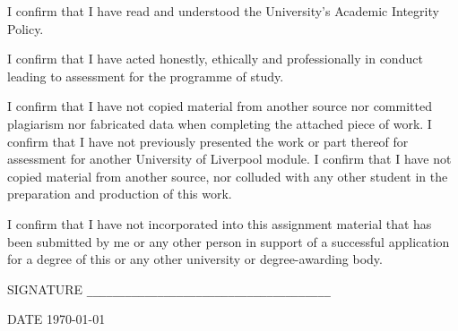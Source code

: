 \documentclass[a4paper,11pt]{report}
\begin{document}
I confirm that I have read and understood the University's Academic Integrity Policy.

I confirm that I have acted honestly, ethically and professionally in conduct leading
to assessment for the programme of study.  

I confirm that I have not copied material from another source nor committed plagiarism
nor fabricated data when completing the attached piece of work.  I confirm that I have 
not previously presented the work or part thereof for assessment for another University
of Liverpool module.  I confirm that I have not copied material from another source, nor
colluded with any other student in the preparation and production of this work.  

I confirm that I have not incorporated into this assignment material that has been 
submitted by me or any other person in support of a successful application for a 
degree of this or any other university or degree-awarding body.  

\vspace*{1in}

\noindent SIGNATURE \verb!______________________________________!

\noindent DATE \hspace*{.4in}  \today

\vspace*{1in}




\newpage




\newpage



\tableofcontents
\end{document}
